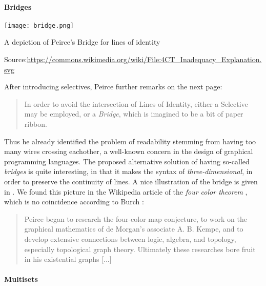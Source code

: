 \begin{scope}
\paragraph{Bridges} 

\begin{marginfigure}
  \texttt{[image: bridge.png]}
  \caption{A depiction of Peirce's Bridge for lines of identity}
  \footnotesize Source:\hspace{3pt}\url{https://commons.wikimedia.org/wiki/File:4CT_Inadequacy_Explanation.svg}
\end{marginfigure}

After introducing selectives, Peirce further remarks on the next page:
\begin{quote}
  In order to avoid the intersection of Lines of Identity, either a Selective
may be employed, or a \emph{Bridge}, which is imagined to be a bit of paper
ribbon.
\end{quote}
Thus he already identified the problem of readability stemming from having too
many wires crossing eachother, a well-known concern in the design of graphical
programming languages. The proposed
alternative solution of having so-called \emph{bridges} is quite interesting, in
that it makes the syntax of  \emph{three-dimensional}, in order to preserve
the continuity of lines. A nice illustration of the bridge is given in
. We found this picture in the Wikipedia article of the
\emph{four color theorem} \cite{noauthor_four_2023}, which is no coincidence
according to Burch \cite{sep-peirce}:
\begin{quote}
  Peirce began to research the four-color map conjecture, to work on the
graphical mathematics of de Morgan's associate A. B. Kempe, and to develop
extensive connections between logic, algebra, and topology, especially
topological graph theory. Ultimately these researches bore fruit in his
existential graphs [...]
\end{quote}

\paragraph{Multisets}


\end{scope}
